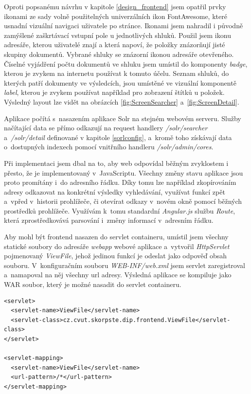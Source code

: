 Oproti popsanému návrhu v kapitole \ref{design_frontend} jsem opatřil prvky ikonami ze sady volně použitelných univerzálních ikon FontAwesome\cite{fontawesome}, které usnadní vizuální navigaci uživatele po stránce. Ikonami jsem nahradil i původně zamýšlené zaškrtávací vstupní pole u jednotlivých shluků. Použil jsem ikonu adresáře, kterou uživatelé znají a která napoví, že položky znázorňují jisté skupiny dokumentů. Vybrané shluky se znázorní ikonou adresáře otevřeného. Číselné vyjádření počtu dokumentů ve shluku jsem umístil do komponenty \emph{badge}, kterou je zvykem na internetu používat k tomuto účelu. Seznam shluků, do kterých patří dokumenty ve výsledcích, jsou umístěné ve vizuální komponentě \emph{label}, kterou je zvykem používat například pro zobrazení štítků u položek. Výsledný layout lze vidět na obrázcích \ref{fig:ScreenSearcher} a~\ref{fig:ScreenDetail}.

Aplikace počítá s~nasazením aplikace Solr na stejném webovém serveru. Služby načítající data se přímo odkazují na request handlery \emph{/solr/searcher} a~\emph{/solr/detail} definované v kapitole \ref{sorlconfig}, a~kromě toho získávají data o~dostupných indexech pomocí vnitřního handleru \emph{/solr/admin/cores}.

Při implementaci jsem dbal na to, aby web odpovídal běžným zvyklostem i přesto, že je implementovaný v~JavaScriptu. Všechny změny stavu aplikace jsou proto promítány i~do adresního řádku. Díky tomu lze například zkopírováním adresy odkazovat na konkrétní výsledky vyhledávání, využívat funkcí zpět a~vpřed v~historii prohlížeče, či otevírat odkazy v~novém okně pomocí běžných prostředků prohlížeče. Využívám k~tomu standardní \emph{Angular.js} službu \emph{Route}, která zprostředkovává parsování i~změny informací v~adresním řádku.

Aby mohl být frontend nasazen do servlet containeru, umístil jsem všechny statické soubory do adresáře \emph{webapp} webové aplikace a~vytvořil \emph{HttpServlet} pojmenovaný \emph{ViewFile}, jehož jedinou funkcí je odeslat jako odpověď obsah souboru. V~konfiguračním souboru \emph{WEB-INF/web.xml} jsem servlet zaregistroval a~namapoval na něj všechny url adresy. Výsledná aplikace se kompiluje jako WAR soubor, který je možné nasadit do servlet containeru.

\begin{verbatim}
<servlet>
  <servlet-name>ViewFile</servlet-name>
  <servlet-class>cz.cvut.skorpste.dip.frontend.ViewFile</servlet-class>
</servlet>

<servlet-mapping>
  <servlet-name>ViewFile</servlet-name>
  <url-pattern>/*</url-pattern>
</servlet-mapping>
\end{verbatim}

